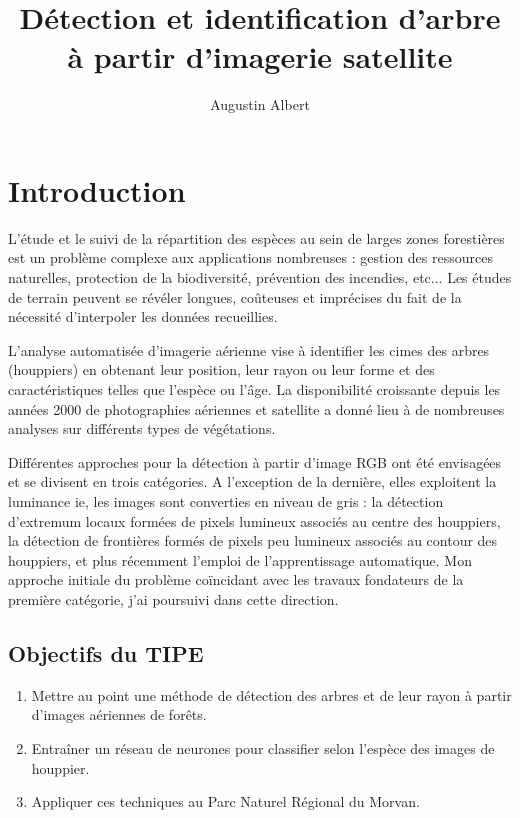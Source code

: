 \documentclass{article}
\title{Détection et identification d'arbre à partir d'imagerie satellite}
\author{Augustin Albert}
\begin{document}

\maketitle
\tableofcontents
\newpage 

\section*{Introduction}

L'étude et le suivi de la répartition des espèces au sein de larges zones forestières est un problème complexe aux applications nombreuses :
gestion des ressources naturelles, protection de la biodiversité, prévention des incendies, etc... Les études de terrain peuvent se révéler longues, coûteuses et imprécises du fait de la nécessité d'interpoler les données recueillies. 

L'analyse automatisée d'imagerie aérienne vise à identifier les cimes des arbres (houppiers) en obtenant leur position, leur rayon ou leur forme et des caractéristiques telles que l'espèce ou l'âge. La disponibilité croissante depuis les années 2000 de photographies aériennes et satellite a donné lieu à de nombreuses analyses sur différents types de végétations.

Différentes approches pour la détection à partir d'image RGB ont été envisagées et se divisent en trois catégories. A l'exception de la dernière, elles exploitent la luminance ie, les images sont converties en niveau de gris : la détection d'extremum locaux formées de pixels lumineux associés au centre des houppiers, la détection de frontières formés de pixels peu lumineux associés au contour des houppiers, et plus récemment l'emploi de l'apprentissage automatique. Mon approche initiale du problème coïncidant avec les travaux fondateurs de la première catégorie, j'ai poursuivi dans cette direction. 

\subsection*{Objectifs du TIPE}		
\begin{enumerate}
	\item Mettre au point une méthode de détection des arbres et de leur rayon à partir d'images aériennes de forêts.  
    \item Entraîner un réseau de neurones pour classifier selon l'espèce des images de houppier.
	\item Appliquer ces techniques au Parc Naturel Régional du Morvan.   
\end{enumerate}
	
\end{document}
